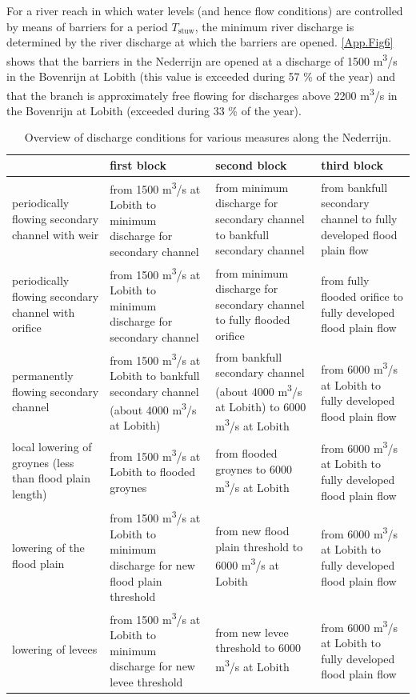 For a river reach in which water levels (and hence flow conditions) are controlled by means of barriers for a period $T_\text{stuw}$, the minimum river discharge is determined by the river discharge at which the barriers are opened.
\autoref{App.Fig6} shows that the barriers in the Nederrijn are opened at a discharge of 1500 m\textsuperscript{3}/s in the Bovenrijn at Lobith (this value is exceeded during 57 \% of the year) and that the branch is approximately free flowing for discharges above 2200 m\textsuperscript{3}/s in the Bovenrijn at Lobith (exceeded during 33 \% of the year).

\begin{table}
\begin{tabular}{p{}|p{}|p{}|p{}}
 & first block & second block & third block \\ \hline
periodically flowing secondary channel with weir & from 1500 m\textsuperscript{3}/s at Lobith to minimum discharge for secondary channel & from minimum discharge for secondary channel to bankfull secondary channel & from bankfull secondary channel to fully developed flood plain flow \\ \hline
periodically flowing secondary channel with orifice & from 1500 m\textsuperscript{3}/s at Lobith to minimum discharge for secondary channel & from minimum discharge for secondary channel to fully flooded orifice & from fully flooded orifice to fully developed flood plain flow \\ \hline
permanently flowing secondary channel & from 1500 m\textsuperscript{3}/s at Lobith to bankfull secondary channel (about 4000 m\textsuperscript{3}/s at Lobith) & from bankfull secondary channel (about 4000 m\textsuperscript{3}/s at Lobith) to 6000 m\textsuperscript{3}/s at Lobith & from 6000 m\textsuperscript{3}/s at Lobith to fully developed flood plain flow \\ \hline
local lowering of groynes (less than flood plain length) & from 1500 m\textsuperscript{3}/s at Lobith to flooded groynes & from flooded groynes to 6000 m\textsuperscript{3}/s at Lobith & from 6000 m\textsuperscript{3}/s at Lobith to fully developed flood plain flow \\ \hline
lowering of the flood plain & from 1500 m\textsuperscript{3}/s at Lobith to minimum discharge for new flood plain threshold & from new flood plain threshold to 6000 m\textsuperscript{3}/s at Lobith & from 6000 m\textsuperscript{3}/s at Lobith to fully developed flood plain flow \\ \hline
lowering of levees & from 1500 m\textsuperscript{3}/s at Lobith to minimum discharge for new levee threshold & from new levee threshold to 6000 m\textsuperscript{3}/s at Lobith & from 6000 m\textsuperscript{3}/s at Lobith to fully developed flood plain flow \\
\end{tabular}

\caption{Overview of discharge conditions for various measures along the Nederrijn.}
\label{App.Tab2}
\end{table}

